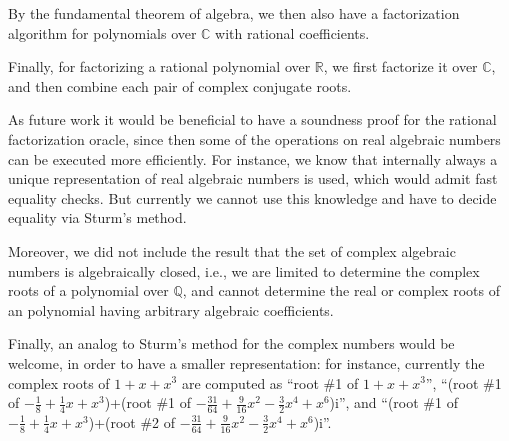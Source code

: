 \documentclass[11pt,a4paper]{article}
\newcommand\rats{\mathbb{Q}}
\newcommand\reals{\mathbb{R}}
\newcommand\complex{\mathbb{C}}
\begin{document}
By the fundamental theorem of algebra, we then also have a factorization algorithm for
polynomials over $\complex$ with rational coefficients.

Finally, for factorizing a rational polynomial over $\reals$, we first factorize it over $\complex$,
and then combine each pair of complex conjugate roots.

\medskip

As future work it would be beneficial to have a soundness proof for the rational factorization oracle, since then some of the operations on real algebraic numbers can be executed more 
efficiently. For instance, we know that internally always a unique representation of 
real algebraic numbers is used, which would admit fast equality checks. But currently we cannot use this knowledge and have to decide equality via Sturm's method.

Moreover, we did not include the result that the set of complex algebraic numbers is algebraically
closed, i.e., we are limited to determine the complex roots of a polynomial over $\rats$, and
cannot determine the real or complex roots of an polynomial having arbitrary algebraic coefficients.

Finally, an analog to Sturm's method for the complex numbers would be welcome, in order to
have a smaller representation: for instance, currently the complex roots of $1 + x + x^3$ are
computed as ``root \#1 of $1 + x + x^3$'', 
``(root \#1 of $-\frac18 + \frac14x + x^3$)+(root \#1 of $-\frac{31}{64} + \frac{9}{16}x^2 - \frac32x^4 + x^6$)i'', and 
``(root \#1 of $-\frac18 + \frac14x + x^3$)+(root \#2 of $-\frac{31}{64} + \frac{9}{16}x^2 - \frac32x^4 + x^6$)i''.







\end{document}

